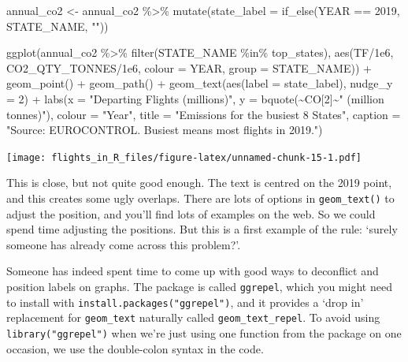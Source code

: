 \documentclass[
]{book}
\newenvironment{Shaded}{\begin{snugshade}}{\end{snugshade}}
\newcommand{\AttributeTok}[1]{\textcolor[rgb]{0.77,0.63,0.00}{#1}}
\newcommand{\DecValTok}[1]{\textcolor[rgb]{0.00,0.00,0.81}{#1}}
\newcommand{\FloatTok}[1]{\textcolor[rgb]{0.00,0.00,0.81}{#1}}
\newcommand{\FunctionTok}[1]{\textcolor[rgb]{0.00,0.00,0.00}{#1}}
\newcommand{\NormalTok}[1]{#1}
\newcommand{\OtherTok}[1]{\textcolor[rgb]{0.56,0.35,0.01}{#1}}
\newcommand{\SpecialCharTok}[1]{\textcolor[rgb]{0.00,0.00,0.00}{#1}}
\newcommand{\StringTok}[1]{\textcolor[rgb]{0.31,0.60,0.02}{#1}}
\begin{document}
\begin{Shaded}
\begin{Highlighting}[]
\NormalTok{annual\_co2 }\OtherTok{\textless{}{-}}\NormalTok{ annual\_co2 }\SpecialCharTok{\%\textgreater{}\%} 
  \FunctionTok{mutate}\NormalTok{(}\AttributeTok{state\_label =} \FunctionTok{if\_else}\NormalTok{(YEAR }\SpecialCharTok{==} \DecValTok{2019}\NormalTok{, STATE\_NAME, }\StringTok{""}\NormalTok{))}

\FunctionTok{ggplot}\NormalTok{(annual\_co2 }\SpecialCharTok{\%\textgreater{}\%} 
         \FunctionTok{filter}\NormalTok{(STATE\_NAME }\SpecialCharTok{\%in\%}\NormalTok{ top\_states), }
       \FunctionTok{aes}\NormalTok{(TF}\SpecialCharTok{/}\FloatTok{1e6}\NormalTok{, CO2\_QTY\_TONNES}\SpecialCharTok{/}\FloatTok{1e6}\NormalTok{, }
           \AttributeTok{colour =}\NormalTok{ YEAR, }\AttributeTok{group =}\NormalTok{ STATE\_NAME)) }\SpecialCharTok{+}
  \FunctionTok{geom\_point}\NormalTok{() }\SpecialCharTok{+} 
  \FunctionTok{geom\_path}\NormalTok{() }\SpecialCharTok{+}
  \FunctionTok{geom\_text}\NormalTok{(}\FunctionTok{aes}\NormalTok{(}\AttributeTok{label =}\NormalTok{ state\_label), }\AttributeTok{nudge\_y =} \DecValTok{2}\NormalTok{) }\SpecialCharTok{+}
  \FunctionTok{labs}\NormalTok{(}\AttributeTok{x =} \StringTok{"Departing Flights (millions)"}\NormalTok{, }
       \AttributeTok{y =} \FunctionTok{bquote}\NormalTok{(}\SpecialCharTok{\textasciitilde{}}\NormalTok{CO[}\DecValTok{2}\NormalTok{]}\SpecialCharTok{\textasciitilde{}}\StringTok{" (million tonnes)"}\NormalTok{),}
       \AttributeTok{colour =} \StringTok{"Year"}\NormalTok{,}
       \AttributeTok{title =} \StringTok{"Emissions for the busiest 8 States"}\NormalTok{,}
       \AttributeTok{caption =} \StringTok{"Source: EUROCONTROL. \textquotesingle{}Busiest\textquotesingle{} means most flights in 2019."}\NormalTok{)}
\end{Highlighting}
\end{Shaded}

\texttt{[image: flights\_in\_R\_files/figure-latex/unnamed-chunk-15-1.pdf]}

This is close, but not quite good enough. The text is centred on the 2019 point, and this creates some ugly overlaps. There are lots of options in \texttt{geom\_text()} to adjust the position, and you'll find lots of examples on the web. So we could spend time adjusting the positions. But this is a first example of the rule: `surely someone has already come across this problem?'.

Someone has indeed spent time to come up with good ways to deconflict and position labels on graphs. The package is called \texttt{ggrepel}, which you might need to install with \texttt{install.packages("ggrepel")}, and it provides a `drop in' replacement for \texttt{geom\_text} naturally called \texttt{geom\_text\_repel}. To avoid using \texttt{library("ggrepel")} when we're just using one function from the package on one occasion, we use the double-colon syntax in the code.
\end{document}
